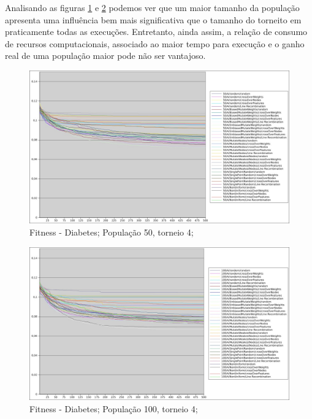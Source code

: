 \documentclass[12pt]{article}
\begin{document}
Analisando as figuras \ref{fig:dia50.4} e \ref{fig:dia100.4} podemos ver que um maior tamanho da população apresenta uma influência bem mais significativa que o tamanho do torneito em praticamente todas as execuções. Entretanto, ainda assim, a relação de consumo de recursos computacionais, associado ao maior tempo para execução e o ganho real de uma população maior pode não ser vantajoso.

\begin{figure}[htp]
\center
\includegraphics[scale=0.33, keepaspectratio]{dia_50_4.jpg} 
\caption{Fitness - Diabetes; População 50, torneio 4;}
\label{fig:dia50.4}
\end{figure}

\begin{figure}[hbp]
\center
\includegraphics[scale=0.33, keepaspectratio]{dia_100_4.jpg} 
\caption{Fitness - Diabetes; População 100, torneio 4;}
\label{fig:dia100.4}
\end{figure}
\end{document}
